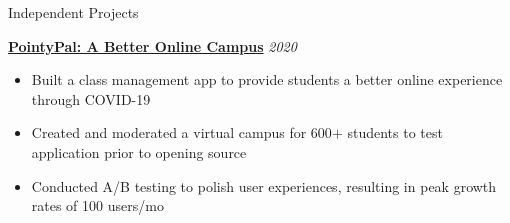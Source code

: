 \documentclass{resume/resume}
\begin{document}
%
%
%
\begin{rSection}{Independent Projects}
    

    \href{https://github.com/UtahTriangle/pointypal}{\bf PointyPal: A Better Online Campus} \hfill {\em 2020}
    \vspace{-6pt}
    \begin{itemize}[nosep]
        \item Built a class management app to provide students a better online experience through COVID-19
        \item Created and moderated a virtual campus for 600$+$ students to test application prior to opening source 
        \item Conducted A/B testing to polish user experiences, resulting in peak growth rates of 100 users/mo
    \end{itemize}



\end{rSection}
\end{document}
